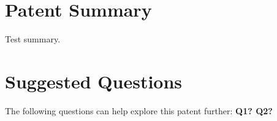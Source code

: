 \documentclass{report}%
\begin{document}
%
\newpage%
\section*{Patent Summary}%
\label{sec:PatentSummary}%
Test summary.%
\vspace{0.3cm}

%
\section*{Suggested Questions}%
\label{sec:SuggestedQuestions}%
The following questions can help explore this patent further:%
\vspace{0.3cm}%
\textbf{\textcolor{accent}{Q1? Q2?}}%
\vspace{0.1cm}

%
\end{document}
